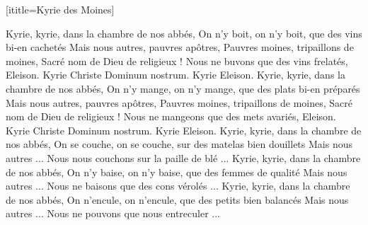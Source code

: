 [ititle={Kyrie des Moines}] 

\beginverse
Kyrie, kyrie, dans la chambre de nos abbés,
On n'y boit, on n'y boit, que des vins bi-en cachetés
Mais nous autres, pauvres apôtres,
Pauvres moines, tripaillons de moines,
Sacré nom de Dieu de religieux !
Nous ne buvons que des vins frelatés, Eleison.
Kyrie Christe Dominum nostrum. Kyrie Eleison.
\endverse
\beginverse
Kyrie, kyrie, dans la chambre de nos abbés,
On n'y mange, on n'y mange, que des plats bi-en préparés
Mais nous autres, pauvres apôtres,
Pauvres moines, tripaillons de moines,
Sacré nom de Dieu de religieux !
Nous ne mangeons que des mets avariés, Eleison.
Kyrie Christe Dominum nostrum. Kyrie Eleison.
\endverse
\beginverse
Kyrie, kyrie, dans la chambre de nos abbés,
On se couche, on se couche, sur des matelas bien douillets
Mais nous autres ...
Nous nous couchons sur la paille de blé ...
\endverse
\beginverse
Kyrie, kyrie, dans la chambre de nos abbés,
On n'y baise, on n'y baise, que des femmes de qualité
Mais nous autres ...
Nous ne baisons que des cons vérolés ...
\endverse
\beginverse
Kyrie, kyrie, dans la chambre de nos abbés,
On n'encule, on n'encule, que des petits bien balancés
Mais nous autres ...
Nous ne pouvons que nous entreculer ...
\endverse
\endsong